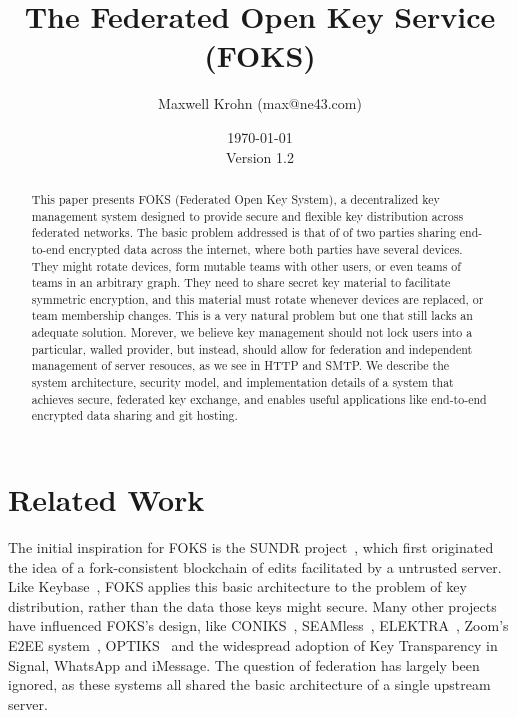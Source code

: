 \documentclass[11pt]{article}
\title{The Federated Open Key Service (FOKS)}
\author{Maxwell Krohn (max@ne43.com)}
\date{\today\\Version 1.2}
\begin{document}
\newcommand{\yubi}{Yubikey}
\newcommand{\Yubi}{Yubikey}
\newcommand{\yubis}{Yubikeys}
\newcommand{\Yubis}{Yubikeys}

\maketitle

\begin{abstract}

This paper presents FOKS (Federated Open Key System), a
decentralized key management system designed to provide secure and flexible key
distribution across federated networks. The basic problem addressed is that of
of two parties sharing end-to-end encrypted data across the internet, where both
parties have several devices. They might rotate devices, form mutable teams with
other users, or even teams of teams in an arbitrary graph. They need to share
secret key material to facilitate symmetric encryption, and this material must
rotate whenever devices are replaced, or team membership changes.  This is a
very natural problem but one that still lacks an adequate solution.  Morever, we
believe key management should not lock users into a particular, walled provider,
but instead, should allow for federation and independent management of server
resouces, as we see in HTTP and SMTP.  We describe the system architecture,
security model, and implementation details of a system that achieves secure,
federated key exchange, and enables useful applications like end-to-end
encrypted data sharing and git hosting.

\end{abstract}











\section{Related Work}

The initial inspiration for FOKS is the SUNDR project~\cite{sundr}, which first
originated the idea of a fork-consistent blockchain of edits facilitated by a
untrusted server.  Like Keybase~\cite{keybase}, FOKS applies this basic
architecture to the problem of key distribution, rather than the data those keys
might secure. Many other projects have influenced FOKS's design, like
CONIKS~\cite{melara2015coniks}, SEAMless~\cite{chase2019seemless}, 
ELEKTRA~\cite{cryptoeprint:2024/107}, Zoom's E2EE system~\cite{zoom_e2e_v4}, 
OPTIKS~\cite{cryptoeprint:2023/1515} and the widespread adoption of Key
Transparency in Signal, WhatsApp and iMessage. The question of federation has
largely been ignored, as these systems all shared the basic architecture of a
single upstream server. 
\end{document}
